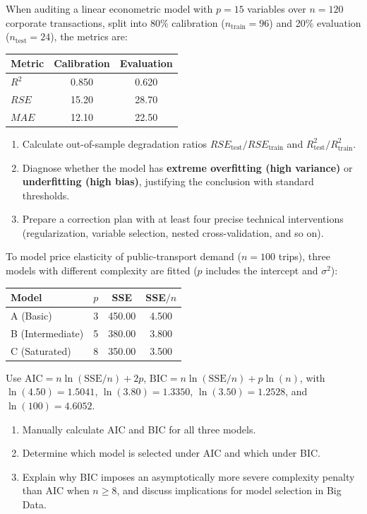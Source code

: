\begin{problema}
\label{prob:d0d57bc}
When auditing a linear econometric model with $p=15$ variables over $n=120$ corporate transactions, split into 80\% calibration ($n_{\text{train}}=96$) and 20\% evaluation ($n_{\text{test}}=24$), the metrics are:
\begin{center}
\begin{tabular}{|l|c|c|}\hline
\textbf{Metric} & \textbf{Calibration} & \textbf{Evaluation} \\ \hline
$R^2$ & 0.850 & 0.620 \\
$RSE$ & 15.20 & 28.70 \\
$MAE$ & 12.10 & 22.50 \\ \hline
\end{tabular}
\end{center}
\begin{enumerate}
\item Calculate out-of-sample degradation ratios $RSE_{\text{test}}/RSE_{\text{train}}$ and $R^2_{\text{test}}/R^2_{\text{train}}$.
\item Diagnose whether the model has \textbf{extreme overfitting (high variance)} or \textbf{underfitting (high bias)}, justifying the conclusion with standard thresholds.
\item Prepare a correction plan with at least four precise technical interventions (regularization, variable selection, nested cross-validation, and so on).
\end{enumerate}
\end{problema}

\begin{problema}
\label{prob:cb39746}
To model price elasticity of public-transport demand ($n=100$ trips), three models with different complexity are fitted ($p$ includes the intercept and $\sigma^2$):
\begin{center}
\begin{tabular}{|l|c|c|c|}\hline
\textbf{Model} & \textbf{$p$} & \textbf{SSE} & \textbf{SSE$/n$} \\ \hline
A (Basic) & 3 & 450.00 & 4.500 \\
B (Intermediate) & 5 & 380.00 & 3.800 \\
C (Saturated) & 8 & 350.00 & 3.500 \\ \hline
\end{tabular}
\end{center}
Use $\text{AIC}=n\ln(\text{SSE}/n)+2p$, $\text{BIC}=n\ln(\text{SSE}/n)+p\ln(n)$, with $\ln(4.50)=1.5041$, $\ln(3.80)=1.3350$, $\ln(3.50)=1.2528$, and $\ln(100)=4.6052$.
\begin{enumerate}
\item Manually calculate AIC and BIC for all three models.
\item Determine which model is selected under AIC and which under BIC.
\item Explain why BIC imposes an asymptotically more severe complexity penalty than AIC when $n\ge8$, and discuss implications for model selection in Big Data.
\end{enumerate}
\end{problema}

